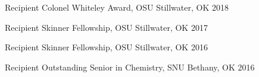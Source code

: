 



\begin{cvhonors}

  \cvhonor
    {Recipient} %
    {Colonel Whiteley Award, OSU} %
    {Stillwater, OK} %
    {2018} %
    
 \cvhonor
	{Recipient} %
	{Skinner Fellowship, OSU} %
	{Stillwater, OK} %
	{2017} %

 \cvhonor 
	{Recipient} %
	{Skinner Fellowship, OSU} %
	{Stillwater, OK} %
	{2016} %

 \cvhonor
 	{Recipient} %
	{Outstanding Senior in Chemistry, SNU} %
	{Bethany, OK} %
	{2016} %



\end{cvhonors}

